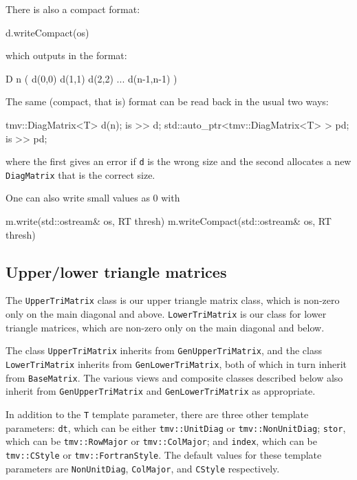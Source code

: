 \documentclass[twoside,letterpaper,11pt]{article}
\renewcommand{\tt}[1]{{\lstinline {#1}}}
\begin{document}
There is also a compact format:
\begin{tmvcode}
d.writeCompact(os)
\end{tmvcode}
which outputs in the format:
\begin{tmvcode}
D n ( d(0,0)  d(1,1)  d(2,2)  ...  d(n-1,n-1) )
\end{tmvcode}

The same (compact, that is) format can be read back in the usual two ways:
\begin{tmvcode}
tmv::DiagMatrix<T> d(n);
is >> d;
std::auto_ptr<tmv::DiagMatrix<T> > pd;
is >> pd;
\end{tmvcode}
where the first gives an error if \tt{d} is the wrong size and the second allocates
a new \tt{DiagMatrix} that is the correct size.

One can also write small values as 0 with
\begin{tmvcode}
m.write(std::ostream& os, RT thresh)
m.writeCompact(std::ostream& os, RT thresh)
\end{tmvcode}

\subsection{Upper/lower triangle matrices}
\label{trimatrix}

The \tt{UpperTriMatrix} class is our upper triangle matrix class, which is non-zero
only on the main diagonal and above.  \tt{LowerTriMatrix} is our class for lower
triangle matrices, which are non-zero only on the main diagonal and below.

The class \tt{UpperTriMatrix} inherits from \tt{GenUpperTriMatrix}, 
and the class \tt{LowerTriMatrix}
inherits from \tt{GenLowerTriMatrix}, both of
which in turn inherit from \tt{BaseMatrix}.  
The various views and composite classes described below
also inherit from \tt{GenUpperTriMatrix} and \tt{GenLowerTriMatrix} 
as appropriate.

In addition to the \tt{T} template parameter, there are three other template 
parameters:
\tt{dt}, which can be either \tt{tmv::UnitDiag} or \tt{tmv::NonUnitDiag};
\tt{stor}, which can be \tt{tmv::RowMajor} or \tt{tmv::ColMajor};
and \tt{index}, which can be \tt{tmv::CStyle} or \tt{tmv::FortranStyle}.
The default values for these template parameters are 
\tt{NonUnitDiag}, \tt{ColMajor}, and \tt{CStyle} respectively.
\end{document}
